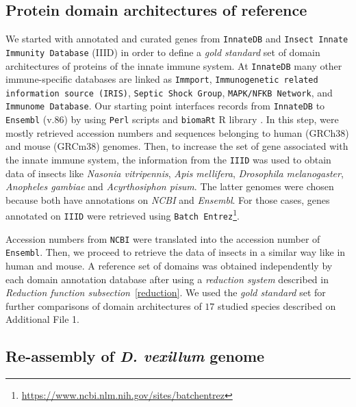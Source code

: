 \documentclass[11pt]{article}
\begin{document}
\subsection*{Protein domain architectures of reference}
We started with annotated and curated genes from \texttt{InnateDB} 
\cite{Breuer01012013} and \texttt{Insect Innate Immunity Database} (IIID) 
\cite{Brucker2012} in order to define a \textsl{gold standard} set of domain 
architectures of proteins of the innate immune system. At \texttt{InnateDB} many 
other immune-specific databases are linked as \texttt{Immport}, 
\texttt{Immunogenetic related information source (IRIS)}, \texttt{Septic Shock 
Group}, \texttt{MAPK/NFKB Network}, and \texttt{Immunome Database}. Our starting 
point interfaces records from \texttt{InnateDB} to \texttt{Ensembl} (v.86) 
by using \texttt{Perl} scripts and \texttt{biomaRt} R library 
\cite{Durinck:2009aa}. In this step, were mostly retrieved accession numbers 
and sequences belonging to human (GRCh38) and mouse (GRCm38) genomes. Then, to 
increase the set of gene associated with the innate immune system, the 
information from the \texttt{IIID} was used to obtain data of insects like 
\textsl{Nasonia vitripennis}, \textsl{Apis mellifera}, \textsl{Drosophila 
melanogaster}, \textsl{Anopheles gambiae} and \textsl{Acyrthosiphon pisum}. The 
latter genomes were chosen because both have annotations on \textsl{NCBI} and 
\textsl{Ensembl}. For those cases, genes annotated on \texttt{IIID} were retrieved using \texttt{Batch Entrez}\footnote{\url{https://www.ncbi.nlm.nih.gov/sites/batchentrez}}. 

Accession numbers from \texttt{NCBI} were translated into the accession number 
of \texttt{Ensembl}. Then, we proceed to retrieve the data of insects in a 
similar way like in human and mouse. A reference set of domains was obtained 
independently by each domain annotation database after using a \textsl{reduction 
system} described in \textsl{Reduction function subsection}~\ref{reduction}. We 
used the \textsl{gold standard} set for further comparisons of domain 
architectures of $17$ studied species described on Additional File 1.

\subsection*{Re-assembly of \textit{D. vexillum} genome}
\end{document}

